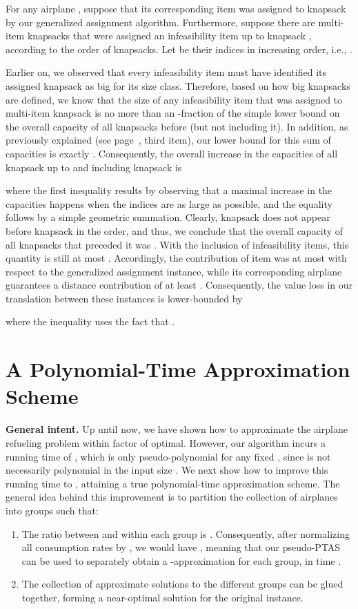 \documentclass[11pt]{article}
\theoremstyle{plain}
\theoremstyle{definition}
\begin{document}
For any airplane , suppose that its corresponding item  was assigned to knapsack  by our generalized assignment algorithm. Furthermore, suppose there are  multi-item knapsacks that were assigned an infeasibility item up to knapsack , according to the order of knapsacks. Let  be their indices in increasing order, i.e., .

Earlier on, we observed that every infeasibility item must have identified its assigned knapsack as big for its size class. Therefore, based on how big knapsacks are defined, we know that the size of any infeasibility item that was assigned to multi-item knapsack  is no more than an -fraction of the simple lower bound on the overall capacity of all knapsacks before  (but not including it). In addition, as previously explained (see page~\pageref{items:properties_instance}, third item), our lower bound for this sum of capacities is exactly . Consequently, the overall increase in the capacities of all knapsack up to and including knapsack  is

where the first inequality results by observing that a maximal increase in the capacities happens when the indices are as large as possible, and the equality follows by a simple geometric summation. Clearly, knapsack  does not appear before knapsack  in the order, and thus, we conclude that the overall capacity of all knapsacks that preceded it was . With the inclusion of infeasibility items, this quantity is still at most . Accordingly, the contribution of item  was at most  with respect to the generalized assignment instance, while its corresponding airplane  guarantees a distance contribution of at least . Consequently, the value loss in our translation between these instances is lower-bounded by

where the inequality uses the fact that .



\section{A Polynomial-Time Approximation Scheme} \label{app:ptas}

{\bf General intent.} Up until now, we have shown how to approximate the airplane refueling problem within factor  of optimal. However, our algorithm incurs a running time of , which is only pseudo-polynomial for any fixed , since  is not necessarily polynomial in the input size . We next show how to improve this running time to , attaining a true polynomial-time approximation scheme. The general idea behind this improvement is to partition the collection of airplanes into groups such that:
\begin{enumerate}
\item The ratio between  and  within each group is . Consequently, after normalizing all consumption rates by , we would have , meaning that our pseudo-PTAS can be used to separately obtain a -approximation for each group, in time .

\item The collection of approximate solutions to the different groups can be glued together, forming a near-optimal solution for the original instance.
\end{enumerate}
\end{document}

